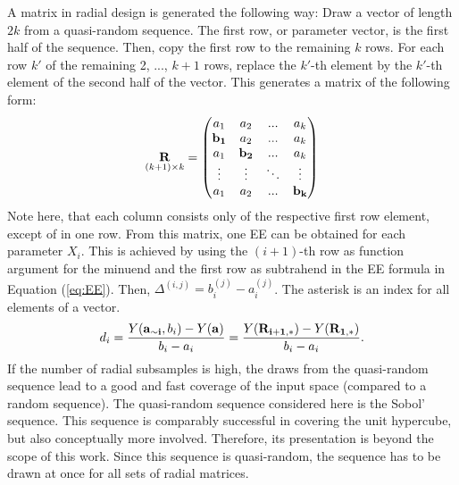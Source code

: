 \documentclass[a4paper,12pt]{article}
\begin{document}
\noindent
A matrix in radial design is generated the following way: Draw a vector of length $2k$ from a quasi-random sequence. The first row, or parameter vector, is the first half of the sequence. Then, copy the first row to the remaining $k$ rows. For each row $k'$ of the remaining 2, ..., $k+1$ rows, replace the $k'$-th element by the $k'$-th element of the second half of the vector. This generates a matrix of the following form:
\begin{align}
\underset{(k+1)\times k}{\bold{R}} =
\begin{pmatrix}
a_1 & a_2 & ... & a_k \\
\bold{b_1} & a_2 & ... & a_k \\
a_1 & \bold{b_2} & ... & a_k \\
\vdots & \vdots & 	\ddots & \vdots\\
a_1 & a_2 & ... & \bold{b_k}
\end{pmatrix}
\end{align}
\noindent
Note here, that each column consists only of the respective first row element, except of in one row.
From this matrix, one EE can be obtained for each parameter $X_i$. This is achieved by using the $(i+1)$-th row as function argument for the minuend and the first row as subtrahend in the EE formula in Equation (\ref{eq:EE}). Then, $\Delta^{(i,j)} = b_i^{(j)} - a_i^{(j)}$. The asterisk is an index for all elements of a vector.
\begin{align} \label{eq:rad}
d_i =  \frac{Y(\bold{a_{\sim i}}, b_i) - Y(\bold{a})}{b_i - a_i} = \frac{Y(\bold{R_{i+1,*}}) -  Y(\bold{R_{1,*}})}{b_i - a_i}.
\end{align}
If the number of radial subsamples is high, the draws from the quasi-random sequence lead to a good and fast coverage of the input space (compared to a random sequence). The quasi-random sequence considered here is the Sobol' sequence. This sequence is comparably successful in covering the unit hypercube, but also conceptually more involved. Therefore, its presentation is beyond the scope of this work. Since this sequence is quasi-random, the sequence has to be drawn at once for all sets of radial matrices.\\
\end{document}
